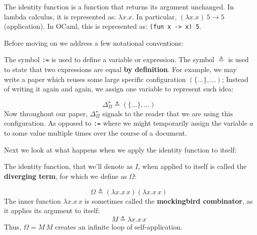   \begin{Def}

    \label{def:identity-func}
    The identity function is a function that returns its argument unchanged. In lambda calculus, it is represented as:
    $
    \lambda x. x
    $.
    \noindent
    In particular,
    $
    (\lambda x. x)\ 5 \rightarrow 5
    $ (application).
    \noindent
    In OCaml, this is represented as: \texttt{(fun x -> x) 5}.
  \end{Def}

  \newpage 

\noindent
Before moving on we address a few notational conventions:
\begin{Def}[Symbols $\triangleq$ vs. :=]

    The symbol \texttt{:=} is used to define a variable or expression.  
    The symbol $\triangleq$ is used to state that two expressions are equal \textbf{by definition}.
    For example, we may write a paper which reuses some large specific configuration $(\{\dots\}, \dots  )$; Instead of 
    writing it again and again, we assign one variable to represent such idea:
    
    \Large
    \[
    \Delta^{\star}_{\Pi}   \triangleq (\{\dots\}, \dots  )
    \]
    \normalsize
    Now throughout our paper, $\Delta^{\star}_{\Pi}$ signals to the reader that we are using this configuration.
    As opposed to \texttt{:=} where we might temporarily assign the variable $a$ to some value multiple times over 
    the course of a document.
    \end{Def}
    
\noindent
Next we look at what happens when we apply the identity function to itself:

\begin{Def}

    The identity function, that we'll denote as $I$, when applied to itself is called the \textbf{diverging term},
    for which we define as $\Omega$:

    \Large
    \[
      \Omega\triangleq (\lambda x. x\,x)(\lambda x. x\,x)
    \]
    \normalsize
    \noindent    
    The inner function \(\lambda x. x\,x\) is sometimes called the \textbf{mockingbird combinator}, as it applies its argument to itself:
    \Large
    \[
      M \triangleq \lambda x. x\,x
    \]
    \normalsize
    Thus, \(\Omega = M\,M\) creates an infinite loop of self-application.
  \end{Def}

